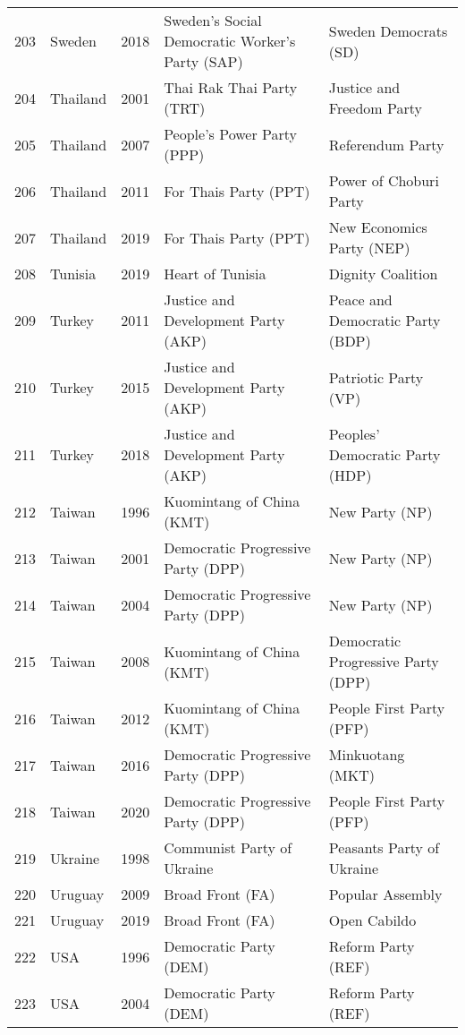 \documentclass[12pt]{article}
\begin{document}
\begin{table}[ht]
\begin{footnotesize}
\begin{tabular}{rllll}
  203 & Sweden & 2018 &   Sweden's Social Democratic Worker's Party (SAP) &   Sweden Democrats (SD) \\ 
  204 & Thailand & 2001 &   Thai Rak Thai Party (TRT) &   Justice and Freedom Party \\ 
  205 & Thailand & 2007 &   People's Power Party (PPP) &   Referendum Party  \\ 
  206 & Thailand & 2011 &   For Thais Party (PPT) &   Power of Choburi Party \\ 
  207 & Thailand & 2019 &   For Thais Party (PPT) &   New Economics Party (NEP) \\ 
  208 & Tunisia & 2019 &   Heart of Tunisia &   Dignity Coalition \\ 
  209 & Turkey & 2011 &   Justice and Development Party (AKP) &   Peace and Democratic Party (BDP) \\ 
  210 & Turkey & 2015 &   Justice and Development Party (AKP) &   Patriotic Party (VP) \\ 
  211 & Turkey & 2018 &   Justice and Development Party (AKP) &   Peoples' Democratic Party (HDP) \\ 
  212 & Taiwan & 1996 &   Kuomintang of China (KMT)  &   New Party (NP) \\ 
  213 & Taiwan & 2001 &   Democratic Progressive Party (DPP) &   New Party (NP) \\ 
  214 & Taiwan & 2004 &   Democratic Progressive Party (DPP) &   New Party (NP) \\ 
  215 & Taiwan & 2008 &   Kuomintang of China (KMT)  &   Democratic Progressive Party (DPP) \\ 
  216 & Taiwan & 2012 &   Kuomintang of China (KMT)  &   People First Party (PFP) \\ 
  217 & Taiwan & 2016 &   Democratic Progressive Party (DPP) &   Minkuotang (MKT) \\ 
  218 & Taiwan & 2020 &   Democratic Progressive Party (DPP) &   People First Party (PFP) \\ 
  219 & Ukraine & 1998 &   Communist Party of Ukraine &   Peasants Party of Ukraine \\ 
  220 & Uruguay & 2009 &   Broad Front (FA) &   Popular Assembly \\ 
  221 & Uruguay & 2019 &   Broad Front (FA) &   Open Cabildo \\ 
  222 &  USA  & 1996 &   Democratic Party (DEM) &   Reform Party (REF) \\ 
  223 &  USA  & 2004 &   Democratic Party (DEM) &   Reform Party (REF) \\ 

\end{tabular}
\end{footnotesize}
\end{table}
\end{document}
